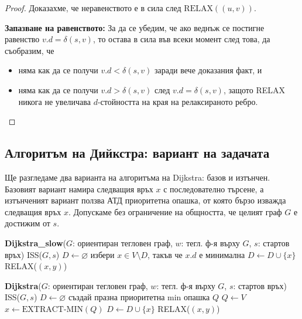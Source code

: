 \documentclass{article}
\renewcommand{\\}{\newline}
\begin{document}
\begin{proof}
    Доказахме, че неравенството е в сила след \(\text{RELAX}((u, v))\).
    
    \textbf{Запазване на равенството:} За да се убедим, че ако веднъж се постигне равенство \(v.d = \delta(s, v)\), то остава в сила във всеки момент след това, да съобразим, че
    
    \begin{itemize}
        \item няма как да се получи \(v.d < \delta(s, v)\) заради вече доказания факт, и
        \item няма как да се получи \(v.d > \delta(s, v)\) след \(v.d = \delta(s, v)\), защото RELAX никога не увеличава \(d\)-стойността на края на релаксираното ребро.
    \end{itemize}
\end{proof}

\subsection{Алгоритъм на Дийкстра: вариант на задачата}
Ще разгледаме два варианта на алгоритъма на Dijkstra: базов и изтънчен. Базовият вариант намира следващия връх \(x\) с последователно търсене, а изтънченият вариант ползва АТД приоритетна опашка, от която бързо изважда следващия връх \(x\). Допускаме без ограничение на общността, че целият граф \(G\) е достижим от \(s\).

\begin{algorithmic}[1]
\State \textbf{Dijkstra\_slow}(\(G\): ориентиран тегловен граф, \(w\): тегл. ф-я върху \(G\), \(s\): стартов връх)
\State ISS(\(G, s\))
\State \(D \gets \varnothing\)
    \State избери \(x \in V \setminus D\), такъв че \(x.d\) е минимална
    \State \(D \gets D \cup \{x\}\)
        \State RELAX(\((x,y)\))
    \EndFor
\EndWhile
\end{algorithmic}
\vspace{1cm}
\begin{algorithmic}[1]
\State \textbf{Dijkstra}(\(G\): ориентиран тегловен граф, \(w\): тегл. ф-я върху \(G\), \(s\): стартов връх)
\State ISS(\(G, s\))
\State \(D \gets \varnothing\)
\State създай празна приоритетна min опашка \(Q\)
\State \(Q \gets V\)
    \State \(x \gets \text{EXTRACT-MIN}(Q)\)
    \State \(D \gets D \cup \{x\}\)
        \State RELAX(\((x,y)\))
    \EndFor
\EndWhile
\end{algorithmic}
\end{document}
